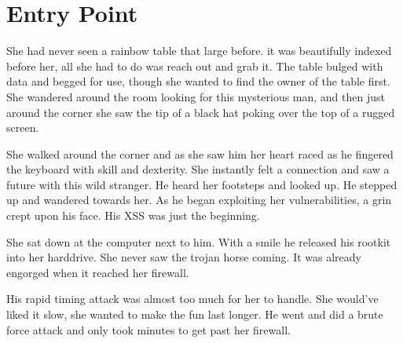 \chapter{Entry Point}

She had never seen a rainbow table that large before. it was beautifully
indexed before her, all she had to do was reach out and grab it. The table
bulged with data and begged for use, though she wanted to find the owner
of the table first. She wandered around the room looking for this
mysterious man, and then just around the corner she saw the tip of a black
hat poking over the top of a rugged screen.

She walked around the corner and as she saw him her heart raced as he
fingered the keyboard with skill and dexterity. She instantly felt a
connection and saw a future with this wild stranger. He heard her footsteps
and looked up. He stepped up and wandered towards her. As he began
exploiting her vulnerabilities, a grin crept upon his face. His XSS was
just the beginning.

She sat down at the computer next to him. With a smile he released his
rootkit into her harddrive. She never saw the trojan horse coming. It was
already engorged when it reached her firewall.

His rapid timing attack was almost too much for her to handle. She would've
liked it slow, she wanted to make the fun last longer. He went and did a
brute force attack and only took minutes to get past her firewall.
